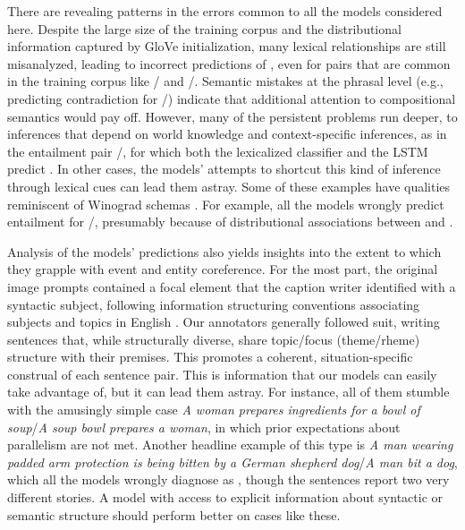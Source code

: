 There are revealing patterns in the errors common to all the models
considered here. Despite the large size of the training corpus and the
distributional information captured by GloVe initialization, many
lexical relationships are still misanalyzed, leading to incorrect
predictions of , even for pairs that are common in the
training corpus like / and
/. Semantic mistakes at the phrasal level
(e.g., predicting contradiction for /) indicate
that additional attention to compositional semantics would pay off.
%
However, many of the persistent problems run deeper, to inferences
that depend on world knowledge and context-specific inferences, as in
the entailment pair /, for which both
the lexicalized classifier and the LSTM predict . 
In other cases, the models' attempts to shortcut this kind of inference 
through lexical cues can lead them astray. 
Some of these examples have qualities
reminiscent of Winograd schemas \cite{Winograd:1972,Levesque:2013}. For
example, all the models wrongly predict
entailment for /, presumably because of
distributional associations between  and .

Analysis of the models' predictions also yields insights into the
extent to which they grapple with event and entity coreference. For
the most part, the original image prompts contained a focal element
that the caption writer identified with a syntactic subject, following
information structuring conventions associating subjects and topics in
English \cite{Ward04}. Our annotators generally followed suit, writing
sentences that, while structurally diverse, share topic/focus (theme/rheme)
structure with their premises.
This promotes a coherent, situation-specific construal of each sentence
pair. This is information that our models can easily take advantage
of, but it can lead them astray. For instance, all of them stumble
with the amusingly simple case \emph{A woman prepares ingredients for
  a bowl of soup}/\emph{A soup bowl prepares a woman}, in which prior
expectations about parallelism are not met. Another headline example
of this type is \emph{A man wearing padded arm protection is being
  bitten by a German shepherd dog}/\emph{A man bit a dog}, which all
the models wrongly diagnose as , though the sentences
report two very different stories. A model with access
to explicit information about syntactic or semantic structure should perform
better on cases like these.

